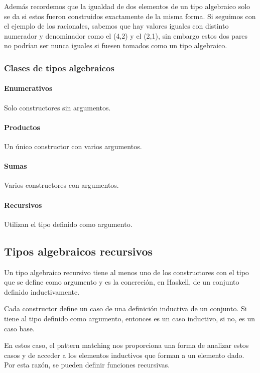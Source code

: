 Además recordemos que la igualdad de dos elementos de un tipo algebraico solo se da si estos fueron construidos exactamente de la misma forma. Si seguimos con el ejemplo de los racionales, sabemos que hay valores iguales con distinto numerador y denominador como el (4,2) y el (2,1), sin embargo estos dos pares no podrían ser nunca iguales si fuesen tomados como un tipo algebraico.

\subsubsection{Clases de tipos algebraicos}

\paragraph{Enumerativos} Solo constructores sin argumentos.

\paragraph{Productos} Un único constructor con varios argumentos.

\paragraph{Sumas} Varios constructores con argumentos.

\paragraph{Recursivos} Utilizan el tipo definido como argumento.

\subsection{Tipos algebraicos recursivos}
Un tipo algebraico recursivo tiene al menos uno de los constructores con el tipo que se define como argumento y es la concreción, en Haskell, de un conjunto definido inductivamente.

Cada constructor define un caso de una definición inductiva de un conjunto. Si tiene al tipo definido como argumento, entonces es un caso inductivo, si no, es un caso base.

En estos caso, el pattern matching nos proporciona una forma de analizar estos casos y de acceder a los elementos inductivos que forman a un elemento dado. Por esta razón, se pueden definir funciones recursivas.

